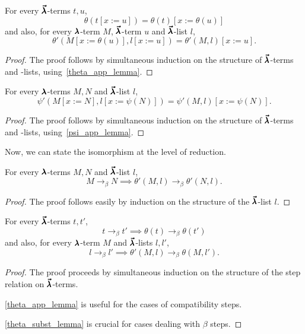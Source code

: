 \begin{lemma}
  \label{theta_subst_lemma}
  For every $\pmb{\vec \lambda}$-terms $t, u$,
  \[ \theta(t[x := u]) = \theta(t)[x := \theta(u)] \]
  and also, for every $\pmb{\lambda}$-term $M$,  $\pmb{\vec \lambda}$-term $u$ and $\pmb{\vec \lambda}$-list $l$,
  \[ \theta'(M[x := \theta(u)], l[x := u]) = \theta'(M, l)[x := u]. \]
\end{lemma}
\begin{proof}
  The proof follows by simultaneous induction on the structure of $\pmb{\vec \lambda}$-terms and -lists, using~\cref{theta_app_lemma}.
\end{proof}
  
\begin{lemma}
  \label{psi_subst_lemma}
  For every $\pmb{\lambda}$-terms $M, N$ and $\pmb{\vec \lambda}$-list $l$,
  \[ \psi'(M[x := N], l[x := \psi(N)]) = \psi'(M, l)[x := \psi(N)]. \]
\end{lemma}
\begin{proof}
  The proof follows by simultaneous induction on the structure of $\pmb{\vec \lambda}$-terms and -lists, using~\cref{psi_app_lemma}.
\end{proof}

Now, we can state the isomorphism at the level of reduction.

\begin{lemma}
  \label{theta_step_lemma}
  For every $\pmb{\lambda}$-terms $M, N$ and $\pmb{\vec \lambda}$-list $l$,
  \[ M \to_{\beta} N \implies \theta'(M, l) \to_{\beta} \theta'(N, l). \]
\end{lemma}
\begin{proof}
  The proof follows easily by induction on the structure of the $\pmb{\vec \lambda}$-list $l$.
\end{proof}

\begin{theorem}
  \label{theorem9}
  For every $\pmb{\vec \lambda}$-terms $t, t'$,
  \[ t \to_{\beta} t' \implies \theta(t) \to_{\beta} \theta(t') \]
  and also, for every $\pmb{\lambda}$-term $M$ and $\pmb{\vec \lambda}$-lists $l, l'$,
  \[ l \to_{\beta} l' \implies \theta'(M, l) \to_{\beta} \theta(M, l'). \]
\end{theorem}
\begin{proof}
  The proof proceeds by simultaneous induction on the structure of the step relation on $\pmb{\vec \lambda}$-terms.

  \cref{theta_app_lemma} is useful for the cases of compatibility steps.

  \cref{theta_subst_lemma} is crucial for cases dealing with $\beta$ steps.
\end{proof}


